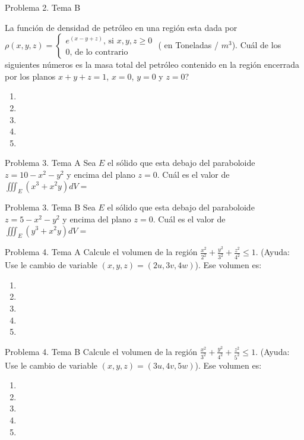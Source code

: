 \documentclass[usepdftitle=false]{beamer}
\begin{document}
\begin{frame}{Problema 2. Tema B}

La funci\'on de densidad de petr\'oleo en una regi\'on esta dada por $\rho(x,y,z)=\begin{cases}
e^{(x-y+z)}\text{, si $x,y,z\geq 0$}\\
0\text{, de lo contrario}
\end{cases}$
( en Toneladas / $m^3$). Cu\'al de los siguientes n\'umeros es la masa total del petr\'oleo contenido en la regi\'on encerrada por los planos $x+y+z=1$, $x=0$, $y=0$ y $z=0$?
\begin{enumerate}
\item
\item
\item
\item
\item
\end{enumerate}
\end{frame}

\begin{frame}{Problema 3. Tema A}
Sea $E$ el s\'olido que esta debajo del paraboloide $z=10-x^2-y^2$ y encima del plano $z=0$. Cu\'al es el valor de $\iiint_E (x^3+x^2y)dV=$
\end{frame}

\begin{frame}{Problema 3. Tema B}
Sea $E$ el s\'olido que esta debajo del paraboloide $z=5-x^2-y^2$ y encima del plano $z=0$. Cu\'al es el valor de $\iiint_E (y^3+x^2y)dV=$
\end{frame}


\begin{frame}{Problema 4. Tema A}
Calcule el volumen de la regi\'on $\frac{x^2}{2^2}+\frac{y^2}{3^2}+\frac{z^2}{4^2}\leq 1$. (Ayuda: Use le cambio de variable $(x,y,z)=(2u,3v,4w)$). Ese volumen es:

\begin{enumerate}
\item
\item
\item
\item
\item
\end{enumerate}

\end{frame}

\begin{frame}{Problema 4. Tema B}
Calcule el volumen de la regi\'on $\frac{x^2}{3^2}+\frac{y^2}{4^2}+\frac{z^2}{5^2}\leq 1$. (Ayuda: Use le cambio de variable $(x,y,z)=(3u,4v,5w)$). Ese volumen es:

\begin{enumerate}
\item
\item
\item
\item
\item
\end{enumerate}

\end{frame}
\end{document}
